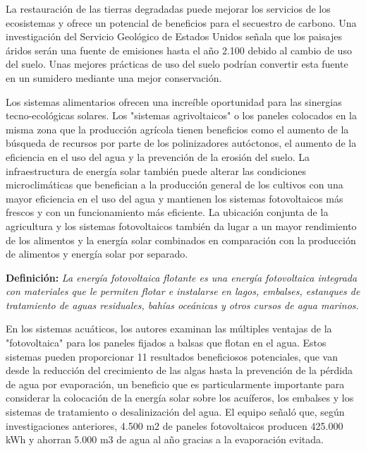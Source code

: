 \documentclass[runningheads]{llncs}
\begin{document}
La restauración de las tierras degradadas puede mejorar los servicios de los ecosistemas y ofrece un potencial de beneficios para el secuestro de carbono. Una investigación del Servicio Geológico de Estados Unidos señala que los paisajes áridos serán una fuente de emisiones hasta el año 2.100 debido al cambio de uso del suelo. Unas mejores prácticas de uso del suelo podrían convertir esta fuente en un sumidero mediante una mejor conservación.\\ \par
Los sistemas alimentarios ofrecen una increíble oportunidad para las sinergias tecno-ecológicas solares. Los "sistemas agrivoltaicos" o los paneles colocados en la misma zona que la producción agrícola tienen beneficios como el aumento de la búsqueda de recursos por parte de los polinizadores autóctonos, el aumento de la eficiencia en el uso del agua y la prevención de la erosión del suelo. La infraestructura de energía solar también puede alterar las condiciones microclimáticas que benefician a la producción general de los cultivos con una mayor eficiencia en el uso del agua y mantienen los sistemas fotovoltaicos más frescos y con un funcionamiento más eficiente. La ubicación conjunta de la agricultura y los sistemas fotovoltaicos también da lugar a un mayor rendimiento de los alimentos y la energía solar combinados en comparación con la producción de alimentos y energía solar por separado.\\ \par
\textbf{Definición:} \textit{La energía fotovoltaica flotante es una energía fotovoltaica integrada con materiales que le permiten flotar e instalarse en lagos, embalses, estanques de tratamiento de aguas residuales, bahías oceánicas y otros cursos de agua marinos.}\\ \par
En los sistemas acuáticos, los autores examinan las múltiples ventajas de la "fotovoltaica" para los paneles fijados a balsas que flotan en el agua. Estos sistemas pueden proporcionar 11 resultados beneficiosos potenciales, que van desde la reducción del crecimiento de las algas hasta la prevención de la pérdida de agua por evaporación, un beneficio que es particularmente importante para considerar la colocación de la energía solar sobre los acuíferos, los embalses y los sistemas de tratamiento o desalinización del agua. El equipo señaló que, según investigaciones anteriores, 4.500 m2 de paneles fotovoltaicos producen 425.000 kWh y ahorran 5.000 m3 de agua al año gracias a la evaporación evitada.\\ \par
\end{document}
